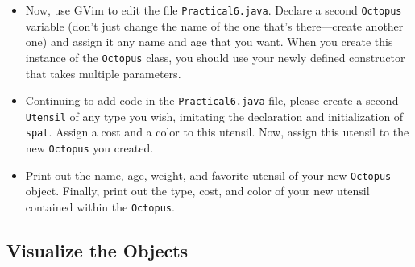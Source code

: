 \begin{enumerate}
\begin{itemize}
\item Now, use GVim to edit the file {\tt Practical6.java}. Declare a second {\tt Octopus} variable (don't just change
    the name of the one that's there---create another one) and assign it any name and age that you want. When you create
  this instance of the {\tt Octopus} class, you should use your newly defined constructor that takes multiple
  parameters.

\item \noindent Continuing to add code in the {\tt Practical6.java} file, please create a second {\tt Utensil} of any
  type you wish, imitating the declaration and initialization of {\tt spat}.  Assign a cost and a color to this utensil.
  Now, assign this utensil to the new {\tt Octopus} you created.

\item \noindent Print out the name, age, weight, and favorite utensil of your new {\tt Octopus} object. Finally, print
  out the type, cost, and color of your new utensil contained within the {\tt Octopus}.

\end{itemize}
\end{enumerate}

\vspace*{-.30in}
\subsection*{Visualize the Objects}
\vspace*{-.1in}

